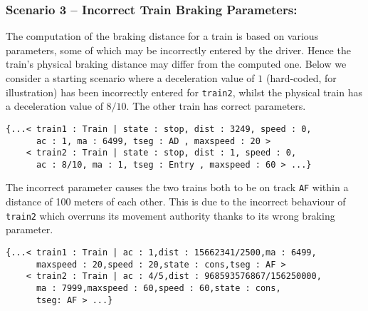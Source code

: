 \subsubsection*{Scenario 3 -- Incorrect Train Braking Parameters:}
The computation of the braking distance for a train is
based on various parameters, some of which may be incorrectly entered
by the driver. Hence the train's physical braking distance may differ
from the computed one. Below we consider a starting scenario where a
deceleration value of $1$ (hard-coded, for illustration) has been
incorrectly entered for \verb|train2|, whilst the physical train has a
deceleration value of $8/10$. The other train has correct parameters.
\begin{lstlisting}
{...< train1 : Train | state : stop, dist : 3249, speed : 0,
      ac : 1, ma : 6499, tseg : AD , maxspeed : 20 >
    < train2 : Train | state : stop, dist : 1, speed : 0,
      ac : 8/10, ma : 1, tseg : Entry , maxspeed : 60 > ...}
\end{lstlisting}
The incorrect parameter causes the two trains both to be on track
\verb|AF| within a distance of 100 meters of each other. This is due
to the incorrect behaviour of \verb|train2| which overruns its movement
authority thanks to its wrong braking parameter.
\begin{lstlisting}
{...< train1 : Train | ac : 1,dist : 15662341/2500,ma : 6499,
      maxspeed : 20,speed : 20,state : cons,tseg : AF >
    < train2 : Train | ac : 4/5,dist : 968593576867/156250000,
      ma : 7999,maxspeed : 60,speed : 60,state : cons,
      tseg: AF > ...}
  
\end{lstlisting}
